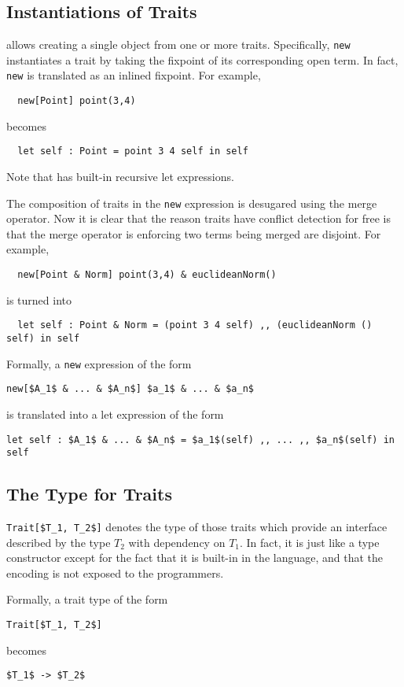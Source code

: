 \subsection{Instantiations of Traits}

\name allows creating a single object from one or more traits. Specifically,
\lstinline{new} instantiates a trait by taking the fixpoint of its
corresponding open term. In fact, \lstinline{new} is translated as an inlined
fixpoint. For example,
\begin{lstlisting}
  new[Point] point(3,4)
\end{lstlisting}
becomes
\begin{lstlisting}
  let self : Point = point 3 4 self in self
\end{lstlisting}
Note that \name has built-in recursive let expressions.

The composition of traits in the \lstinline{new} expression is desugared using
the merge operator. Now it is clear that the reason traits have conflict
detection for free is that the merge operator is enforcing two terms being
merged are disjoint. For example,
\begin{lstlisting}
  new[Point & Norm] point(3,4) & euclideanNorm()
\end{lstlisting}
is turned into
\begin{lstlisting}
  let self : Point & Norm = (point 3 4 self) ,, (euclideanNorm () self) in self
\end{lstlisting}

Formally, a \lstinline{new} expression of the form
\begin{lstlisting}[mathescape=true]
  new[$A_1$ & ... & $A_n$] $a_1$ & ... & $a_n$
\end{lstlisting}
is translated into a let expression of the form
\begin{lstlisting}[mathescape=true]
  let self : $A_1$ & ... & $A_n$ = $a_1$(self) ,, ... ,, $a_n$(self) in self
\end{lstlisting}

\subsection{The Type for Traits}

\lstinline[mathescape=true]{Trait[$T_1, T_2$]} denotes the type of those traits
which provide an interface described by the type $T_2$ with dependency on $T_1$.
In fact, it is just like a type constructor except for the fact that it is
built-in in the language, and that the encoding is not exposed to the
programmers.

Formally, a trait type of the form
\begin{lstlisting}[mathescape=true]
  Trait[$T_1, T_2$]
\end{lstlisting}
becomes
\begin{lstlisting}[mathescape=true]
  $T_1$ -> $T_2$
\end{lstlisting}
